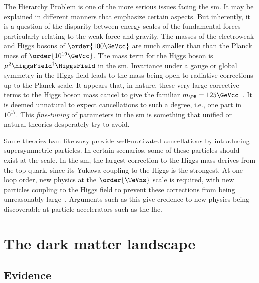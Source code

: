 The Hierarchy Problem is one of the more serious issues facing the \acrlong{sm}. It may be explained in different manners that emphasize certain aspects. But inherently, it is a question of the disparity between energy scales of the fundamental forces---particularly relating to the weak force and gravity. The masses of the electroweak and Higgs bosons of $\order{\text{100}\GeVcc}$ are much smaller than than the Planck mass of $\order{\text{10}^{19}\GeVcc}$. The mass term for the Higgs boson is $\mu^2 \HiggsField^{\dagger} \HiggsField$ in the \acrshort{sm}. Invariance under a gauge or global symmetry in the Higgs field leads to the mass being open to radiative corrections up to the Planck scale. It appears that, in nature, these very large corrective terms to the Higgs boson mass cancel to give the familiar $m_{\PH} = \text{125}\GeVcc$~\cite{Chatrchyan:2012xdj,Aad:2012tfa}. It is deemed unnatural to expect cancellations to such a degree, i.e., one part in $\text{10}^{17}$. This \emph{fine-tuning} of parameters in the \acrlong{sm} is something that unified or natural theories desperately try to avoid.

Some theories \acrfull{bsm} like \acrfull{susy} provide well-motivated cancellations by introducing supersymmetric particles. In certain scenarios, some of these particles should exist at the \TeVns scale. In the \acrshort{sm}, the largest correction to the Higgs mass derives from the top quark, since its Yukawa coupling to the Higgs is the strongest. At one-loop order, new physics at the $\order{\TeVns}$ scale is required, with new particles coupling to the Higgs field to prevent these corrections from being unreasonably large~\cite{Farina:2013ssa}. Arguments such as this give credence to new physics being discoverable at particle accelerators such as the \acrlong{lhc}.




\section{The dark matter landscape}
\label{sec:theory_dm_landscape}

\subsection{Evidence}
\label{subsec:theory_dm_evidence}

